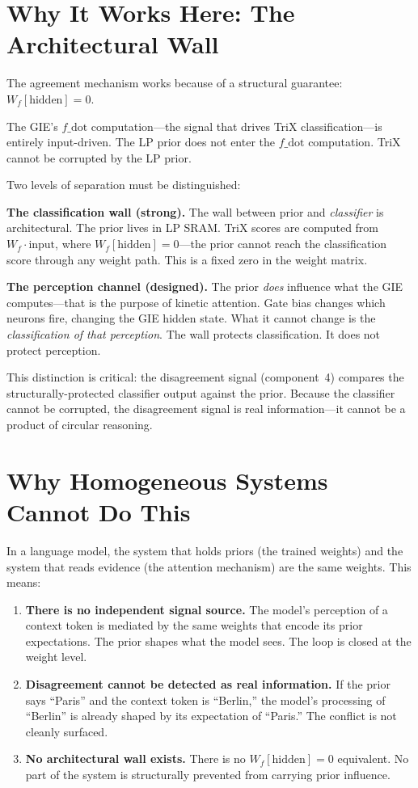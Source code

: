 \documentclass[11pt,letterpaper]{article}
\begin{document}
\section{Why It Works Here: The Architectural Wall}

The agreement mechanism works because of a structural guarantee: $W_f[\text{hidden}] = 0$.

The GIE's $f\_\text{dot}$ computation---the signal that drives TriX classification---is entirely input-driven. The LP prior does not enter the $f\_\text{dot}$ computation. TriX cannot be corrupted by the LP prior.

Two levels of separation must be distinguished:

\textbf{The classification wall (strong).} The wall between prior and \textit{classifier} is architectural. The prior lives in LP SRAM. TriX scores are computed from $W_f \cdot \text{input}$, where $W_f[\text{hidden}] = 0$---the prior cannot reach the classification score through any weight path. This is a fixed zero in the weight matrix.

\textbf{The perception channel (designed).} The prior \textit{does} influence what the GIE computes---that is the purpose of kinetic attention. Gate bias changes which neurons fire, changing the GIE hidden state. What it cannot change is the \textit{classification of that perception}. The wall protects classification. It does not protect perception.

This distinction is critical: the disagreement signal (component~4) compares the structurally-protected classifier output against the prior. Because the classifier cannot be corrupted, the disagreement signal is real information---it cannot be a product of circular reasoning.

\section{Why Homogeneous Systems Cannot Do This}

In a language model, the system that holds priors (the trained weights) and the system that reads evidence (the attention mechanism) are the same weights. This means:

\begin{enumerate}
\item \textbf{There is no independent signal source.} The model's perception of a context token is mediated by the same weights that encode its prior expectations. The prior shapes what the model sees. The loop is closed at the weight level.

\item \textbf{Disagreement cannot be detected as real information.} If the prior says ``Paris'' and the context token is ``Berlin,'' the model's processing of ``Berlin'' is already shaped by its expectation of ``Paris.'' The conflict is not cleanly surfaced.

\item \textbf{No architectural wall exists.} There is no $W_f[\text{hidden}] = 0$ equivalent. No part of the system is structurally prevented from carrying prior influence.
\end{enumerate}
\end{document}
